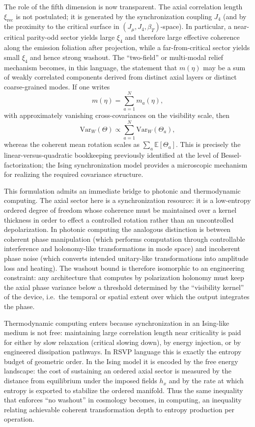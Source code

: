 \documentclass[12pt]{article}
\begin{document}
The role of the fifth dimension is now transparent. The axial correlation length $\xi_{\mathrm{rec}}$ is not postulated; it is generated by the synchronization coupling $J_4$ (and by the proximity to the critical surface in $(J_\mu,J_4,\beta_T)$-space). In particular, a near-critical parity-odd sector yields large $\xi_4$ and therefore large effective coherence along the emission foliation after projection, while a far-from-critical sector yields small $\xi_4$ and hence strong washout. The ``two-field'' or multi-modal relief mechanism becomes, in this language, the statement that $m(\eta)$ may be a sum of weakly correlated components derived from distinct axial layers or distinct coarse-grained modes. If one writes
\begin{equation}
m(\eta)=\sum_{a=1}^{N} m_a(\eta),
\end{equation}
with approximately vanishing cross-covariances on the visibility scale, then
\begin{equation}
\mathrm{Var}_W(\Theta)\propto \sum_{a=1}^{N} \mathrm{Var}_W(\Theta_a),
\end{equation}
whereas the coherent mean rotation scales as $\sum_a \mathbb{E}[\Theta_a]$. This is precisely the linear-versus-quadratic bookkeeping previously identified at the level of Bessel-factorization; the Ising synchronization model provides a microscopic mechanism for realizing the required covariance structure.

This formulation admits an immediate bridge to photonic and thermodynamic computing. The axial sector here is a synchronization resource: it is a low-entropy ordered degree of freedom whose coherence must be maintained over a kernel thickness in order to effect a controlled rotation rather than an uncontrolled depolarization. In photonic computing the analogous distinction is between coherent phase manipulation (which performs computation through controllable interference and holonomy-like transformations in mode space) and incoherent phase noise (which converts intended unitary-like transformations into amplitude loss and heating). The washout bound is therefore isomorphic to an engineering constraint: any architecture that computes by polarization holonomy must keep the axial phase variance below a threshold determined by the ``visibility kernel'' of the device, i.e.\ the temporal or spatial extent over which the output integrates the phase.

Thermodynamic computing enters because synchronization in an Ising-like medium is not free: maintaining large correlation length near criticality is paid for either by slow relaxation (critical slowing down), by energy injection, or by engineered dissipation pathways. In RSVP language this is exactly the entropy budget of geometric order. In the Ising model it is encoded by the free energy landscape: the cost of sustaining an ordered axial sector is measured by the distance from equilibrium under the imposed fields $h_x$ and by the rate at which entropy is exported to stabilize the ordered manifold. Thus the same inequality that enforces ``no washout'' in cosmology becomes, in computing, an inequality relating achievable coherent transformation depth to entropy production per operation.
\end{document}
